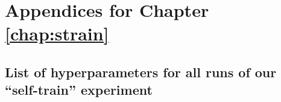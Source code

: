 \chapter{Appendices for Chapter \ref{chap:strain}}
\label{app:strain}

\section{List of hyperparameters for all runs of our ``self-train'' experiment}
\label{app:strain:hyperparameters_selftrain}

